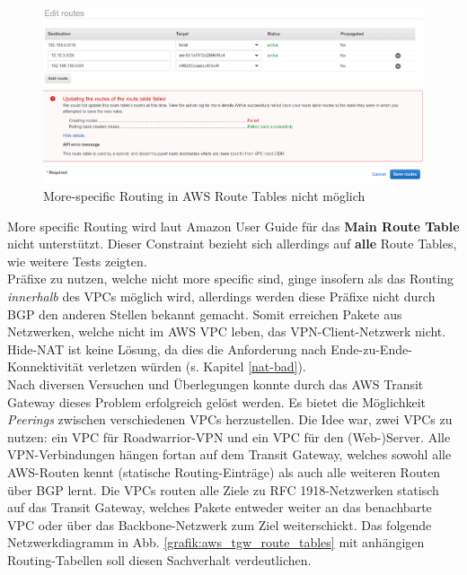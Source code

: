 \begin{figure}[h]
  \centering
  \includegraphics[scale=0.35]{Figures/more_specific_not_allowed_aws.PNG}
  \caption{More-specific Routing in AWS Route Tables nicht möglich}
  \label{grafik:more_specific_not_allowed_aws}
\end{figure}\FloatBarrier
More specific Routing wird laut Amazon User Guide für das \textbf{Main Route Table} nicht unterstützt\cite[S.230]{awsug2020}. Dieser Constraint bezieht sich allerdings auf \textbf{alle} Route Tables, wie weitere Tests zeigten.\\
Präfixe zu nutzen, welche nicht more specific sind, ginge insofern als das Routing \textit{innerhalb} des \gls{VPC}s möglich wird, allerdings werden diese Präfixe nicht durch \gls{BGP} den anderen Stellen bekannt gemacht. Somit erreichen Pakete aus Netzwerken, welche nicht im AWS \gls{VPC} \glqq leben\grqq{}, das VPN-\gls{Client}-Netzwerk nicht.\\
Hide-NAT ist keine Lösung, da dies die Anforderung nach Ende-zu-Ende-Konnektivität verletzen würden (s. Kapitel \ref{nat-bad}).\\
Nach diversen Versuchen und Überlegungen konnte durch das AWS Transit Gateway dieses Problem erfolgreich gelöst werden. Es bietet die Möglichkeit \textit{Peerings} zwischen verschiedenen \gls{VPC}s herzustellen. Die Idee war, zwei \gls{VPC}s zu nutzen: ein \gls{VPC} für \gls{Roadwarrior}-\gls{VPN} und ein \gls{VPC} für den (Web-)Server. Alle \gls{VPN}-Verbindungen hängen fortan auf dem Transit Gateway, welches sowohl alle AWS-Routen kennt (statische Routing-Einträge) als auch alle weiteren Routen über \gls{BGP} lernt. Die \gls{VPC}s routen alle Ziele zu \gls{RFC} 1918-Netzwerken statisch auf das Transit Gateway, welches Pakete entweder weiter an das benachbarte \gls{VPC} oder über das \gls{Backbone}-Netzwerk zum Ziel weiterschickt. Das folgende Netzwerkdiagramm in Abb. \ref{grafik:aws_tgw_route_tables} mit anhängigen Routing-Tabellen soll diesen Sachverhalt verdeutlichen.
